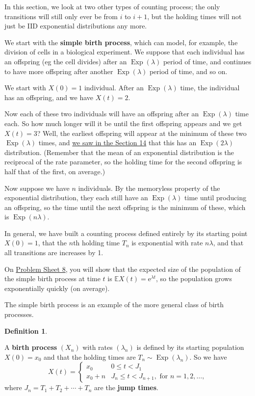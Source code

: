 \documentclass[
  a4paper,
]{article}
\theoremstyle{definition}
\newtheorem{definition}{Definition}[section]
\theoremstyle{definition}
\theoremstyle{definition}
\theoremstyle{remark}
\begin{document}
In this section, we look at two other types of counting process; the only transitions will still only ever be from \(i\) to \(i+1\), but the holding times will not just be IID exponential distributions any more.

We start with the \textbf{simple birth process}, which can model, for example, the division of cells in a biological experiment. We suppose that each individual has an offspring (eg the cell divides) after an \(\operatorname{Exp}(\lambda)\) period of time, and continues to have more offspring after another \(\operatorname{Exp}(\lambda)\) period of time, and so on.

We start with \(X(0) = 1\) individual. After an \(\operatorname{Exp}(\lambda)\) time, the individual has an offspring, and we have \(X(t) = 2\).

Now each of these two individuals will have an offspring after an \(\operatorname{Exp}(\lambda)\) time each. So how much longer will it be until the first offspring appears and we get \(X(t) = 3\)? Well, the earliest offspring will appear at the minimum of these two \(\operatorname{Exp}(\lambda)\) times, and \protect\hyperlink{exponential}{we saw in the Section 14} that this has an \(\operatorname{Exp}(2\lambda)\) distribution. (Remember that the mean of an exponential distribution is the reciprocal of the rate parameter, so the holding time for the second offspring is half that of the first, on average.)

Now suppose we have \(n\) individuals. By the memoryless property of the exponential distribution, they each still have an \(\operatorname{Exp}(\lambda)\) time until producing an offspring, so the time until the next offspring is the minimum of these, which is \(\operatorname{Exp}(n\lambda)\).

In general, we have built a counting process defined entirely by its starting point \(X(0) = 1\), that the \(n\)th holding time \(T_n\) is exponential with rate \(n\lambda\), and that all transitions are increases by 1.

On \protect\hyperlink{P08}{Problem Sheet 8}, you will show that the expected size of the population of the simple birth process at time \(t\) is \(\mathbb EX(t) = \mathrm{e}^{\lambda t}\), so the population grows exponentially quickly (on average).

The simple birth process is an example of the more general class of birth processes.

\begin{definition}
\protect\hypertarget{def:birth-def}{}\label{def:birth-def}

A \textbf{birth process} \((X_n)\) with rates \((\lambda_n)\) is defined by its starting population \(X(0) = x_0\) and that the holding times are \(T_n \sim \operatorname{Exp}(\lambda_n)\). So we have
\[ X(t) = \begin{cases} x_0 & 0 \leq t < J_1 \\
x_0 + n & J_n \leq t < J_{n+1}, \text{ for } n=1,2,\dots ,\end{cases}  \]
where \(J_n = T_1 + T_2 + \cdots + T_n\) are the \textbf{jump times}.

\end{definition}
\end{document}
